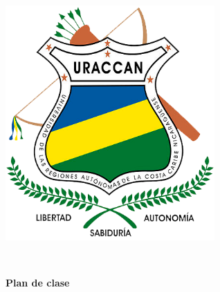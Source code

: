 \begin{titlepage}
    \centering
    \begin{minipage}{0.2\textwidth}
        \centering
        \includegraphics[width=0.6\textwidth]{images/uraccan_logo.png}
    \end{minipage}%
    \begin{minipage}{0.8\textwidth}
        \centering
        \Large{\textbf{\universidad}}\\
    \end{minipage}

    \vfill
    \large{\textbf{Plan de clase}}\\
    \Huge{\textbf{\asignatura}}\\
    \vfill
\end{titlepage}
